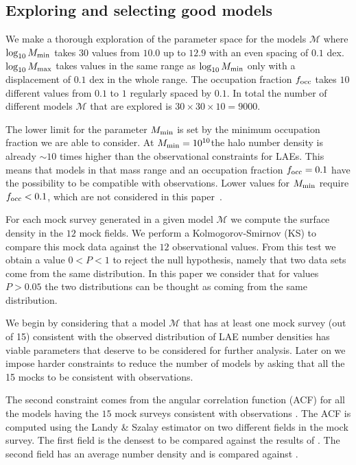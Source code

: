 \documentclass[usenatbib]{mn2e}
\newcommand{\documentname}{paper~}
\newcommand{\hMsun}{{\ifmmode{h^{-1}{\rm
        {M_{\odot}}}}\else{$h^{-1}{\rm{M_{\odot}}}$}\fi}}
\begin{document}
\subsection{Exploring and selecting good models}

We make a thorough exploration of the parameter space for the models
${\mathcal M}$ where $\log_{10} M_{\rm min}$ takes $30$ values from $10.0$ up
to $12.9$ with an even spacing of $0.1$ dex. $\log_{10} M_{\rm max}$
takes values in the same range as $\log_{10}M_{\rm min}$ only with a
displacement of $0.1$ dex in the whole range. The occupation fraction
$f_{\rm occ}$ takes $10$ different values from $0.1$ to $1$ regularly
spaced by $0.1$. In total the number of different models ${\mathcal
  M}$ that are explored is $30 \times 30 \times 10 = 9000$. 


The lower limit for the parameter $M_{\rm min}$ is set by the minimum
occupation fraction we are able to consider. At $M_{\rm
  min}=10^{10}$\hMsun the halo number density is already $\sim 10$
times higher than the observational constraints for LAEs. This means
that models in that mass range and an occupation fraction $f_{\rm
  occ}=0.1$ have the possibility to be compatible with observations. Lower
values for $M_{\rm min}$ require $f_{\rm occ}<0.1$, which are not
considered in this \documentname. 

For each mock survey generated in a given model ${\mathcal M}$ we
compute the surface density in the $12$ mock fields. We perform a
Kolmogorov-Smirnov (KS) to compare this mock data against the $12$
observational values. From this test we obtain a value $0<P<1$ to
reject the null hypothesis, namely that two data sets come from the
same distribution. In this paper we consider that for values $P>0.05$
the two distributions can be thought as coming from the same
distribution.

We begin by considering that  a model ${\mathcal M}$ that has at least
one mock survey (out of 15) consistent with the observed
distribution of LAE number densities has viable parameters that
deserve to be considered for further analysis. Later on we impose
harder constraints to reduce the number of models by asking that all
the 15 mocks to be consistent with observations.

The second constraint  comes from the angular correlation function (ACF)
for all the models having the $15$ mock surveys consistent with
observations . The ACF is computed using 
the Landy \&  Szalay estimator \citep{Landy1993}  on two different 
fields in the mock survey. The first field is the densest to be compared
against the results of \cite{Hayashino2004}. The second field
has an average number density and is compared against \cite{Ouchi2010}.
\end{document}
